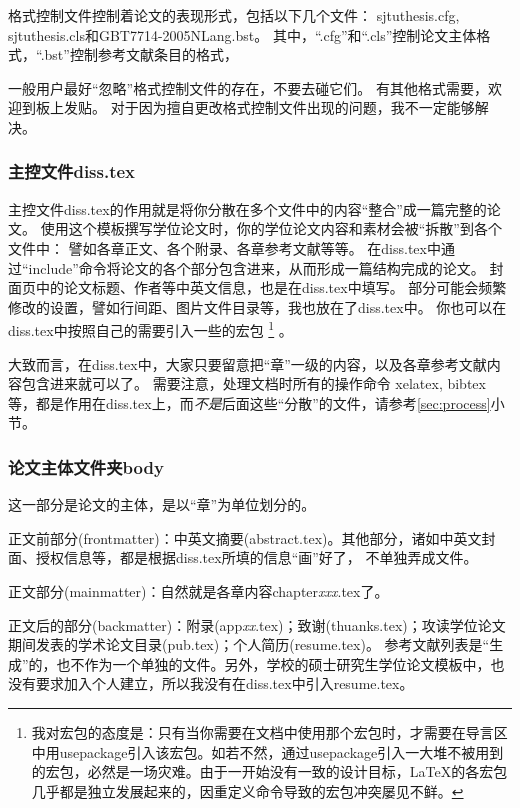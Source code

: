 格式控制文件控制着论文的表现形式，包括以下几个文件：
sjtuthesis.cfg, sjtuthesis.cls和GBT7714-2005NLang.bst。
其中，``.cfg''和``.cls''控制论文主体格式，``.bst''控制参考文献条目的格式，

一般用户最好``忽略''格式控制文件的存在，不要去碰它们。
有其他格式需要，欢迎到板上发贴。
对于因为擅自更改格式控制文件出现的问题，我不一定能够解决。

\subsubsection{主控文件diss.tex}
\label{sec:disstex}

主控文件diss.tex的作用就是将你分散在多个文件中的内容``整合''成一篇完整的论文。
使用这个模板撰写学位论文时，你的学位论文内容和素材会被``拆散''到各个文件中：
譬如各章正文、各个附录、各章参考文献等等。
在diss.tex中通过``include''命令将论文的各个部分包含进来，从而形成一篇结构完成的论文。
封面页中的论文标题、作者等中英文信息，也是在diss.tex中填写。
部分可能会频繁修改的设置，譬如行间距、图片文件目录等，我也放在了diss.tex中。
你也可以在diss.tex中按照自己的需要引入一些的宏包
\footnote{我对宏包的态度是：只有当你需要在文档中使用那个宏包时，才需要在导言区中用usepackage引入该宏包。如若不然，通过usepackage引入一大堆不被用到的宏包，必然是一场灾难。由于一开始没有一致的设计目标，\LaTeX 的各宏包几乎都是独立发展起来的，因重定义命令导致的宏包冲突屡见不鲜。}
。

大致而言，在diss.tex中，大家只要留意把``章''一级的内容，以及各章参考文献内容包含进来就可以了。
需要注意，处理文档时所有的操作命令 \cndash{} xelatex, bibtex等，都是作用在diss.tex上，而\emph{不是}后面这些``分散''的文件，请参考\ref{sec:process}小节。

\subsubsection{论文主体文件夹body}
\label{sec:thesisbody}

这一部分是论文的主体，是以``章''为单位划分的。

正文前部分(frontmatter)：中英文摘要(abstract.tex)。其他部分，诸如中英文封面、授权信息等，都是根据diss.tex所填的信息``画''好了，
不单独弄成文件。

正文部分(mainmatter)：自然就是各章内容chapter\emph{xxx}.tex了。

正文后的部分(backmatter)：附录(app\emph{xx}.tex)；致谢(thuanks.tex)；攻读学位论文期间发表的学术论文目录(pub.tex)；个人简历(resume.tex)。
参考文献列表是``生成''的，也不作为一个单独的文件。另外，学校的硕士研究生学位论文模板中，也没有要求加入个人建立，所以我没有在diss.tex中引入resume.tex。


